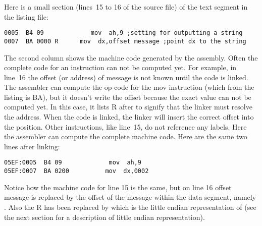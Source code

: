 {Here is a small section (lines~15 to 16 of the source file) of the
text segment in the listing file:
\begin{lstlisting}[language={[x86masm]Assembler},firstnumber=15]
0005  B4 09			    mov  ah,9 ;setting for outputting a string
0007  BA 0000 R		 mov  dx,offset message ;point dx to the string
\end{lstlisting}%
The second column shows the machine code generated by the
assembly. Often the complete code for an instruction can not be
computed yet. For example, in line~16 the offset (or address) of
{\code message} is not known until the code is linked. The assembler
can compute the op-code for the {\code mov} instruction (which from
the listing is BA), but it doesn't write the offset
because the exact value can not be computed yet. In this case, it lists R
after to signify that the linker must resolve the address.  When the code is linked,
the linker will insert the correct offset into the position. Other
instructions, like line~15, do not reference any labels. Here the assembler
can compute the complete machine code.  Here are the same two lines after linking:
\begin{lstlisting}[language={[x86masm]Assembler},firstnumber=15]
05EF:0005  B4 09             mov  ah,9 
05EF:0007  BA 0200	        mov  dx,0002
\end{lstlisting}
Notice how the machine code for line 15 is the same, but on line 16 {\code offset message} is replaced by the offset of the message within the data segment, namely {}.  Also the { R} has been replaced by {} which is the little endian representation of {} (see the next section for a description of little endian representation).  

}
